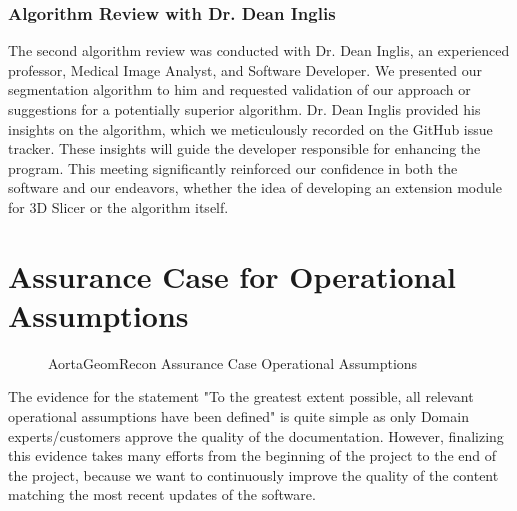 \subsubsection{Algorithm Review with Dr. Dean Inglis}

The second algorithm review was conducted with Dr. Dean Inglis, an experienced professor, Medical Image Analyst, and Software Developer. We presented our segmentation algorithm to him and requested validation of our approach or suggestions for a potentially superior algorithm. Dr. Dean Inglis provided his insights on the algorithm, which we meticulously recorded on the GitHub issue tracker. These insights will guide the developer responsible for enhancing the program. This meeting significantly reinforced our confidence in both the software and our endeavors, whether the idea of developing an extension module for 3D Slicer or the algorithm itself.

\section{Assurance Case for Operational Assumptions}

\begin{figure}[H]
    \centering
    \caption[AortaGeomRecon Assurance Case Operational Assumptions]{AortaGeomRecon Assurance Case Operational Assumptions}
    \label{fig_agr_ac_gba}
\end{figure}

The evidence for the statement "To the greatest extent possible, all relevant operational assumptions have been defined" is quite simple as only Domain experts/customers approve the quality of the documentation. However, finalizing this evidence takes many efforts from the beginning of the project to the end of the project, because we want to continuously improve the quality of the content matching the most recent updates of the software.

